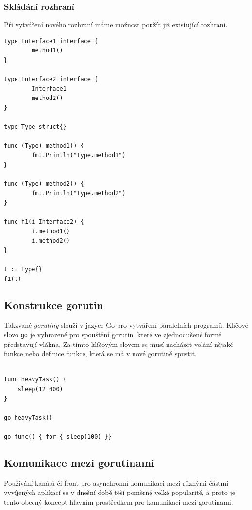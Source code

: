 \documentclass[12pt, a4paper]{article}
\begin{document}
\subsubsection{Skládání rozhraní}
Při vytváření nového rozhraní máme možnost použít již existující rozhraní.

\begin{lstlisting}[caption={Skládání rozhraní}, captionpos=b, language=Golang]
type Interface1 interface {
        method1()
}
 
type Interface2 interface {
        Interface1
        method2()
}
 
type Type struct{}
 
func (Type) method1() {
        fmt.Println("Type.method1")
}
 
func (Type) method2() {
        fmt.Println("Type.method2")
}
 
func f1(i Interface2) {
        i.method1()
        i.method2()
}

t := Type{}
f1(t)

\end{lstlisting}

\subsection{Konstrukce gorutin}
Takzvané \textit{gorutiny} slouží v jazyce Go pro vytváření paralelních programů. Klíčové slovo \texttt{go} je vyhrazené pro spouštění gorutin, které ve zjednodušené formě představují vlákna. Za tímto klíčovým slovem se musí nacházet volání nějaké funkce nebo definice funkce, která se má v nové gorutině spustit.

\begin{lstlisting}[caption={Možnosti spuštění gorutin}, captionpos=b, language=Golang]

func heavyTask() {
    sleep(12 000)
}

go heavyTask() 

go func() { for { sleep(100) }}

\end{lstlisting}

\subsection{Komunikace mezi gorutinami}

Používání kanálů či front pro asynchronní komunikaci mezi různými částmi vyvíjených aplikací se v dnešní době těší poměrně velké popularitě, a proto je tento obecný koncept hlavním prostředkem pro komunikaci mezi gorutinami.
\end{document}
